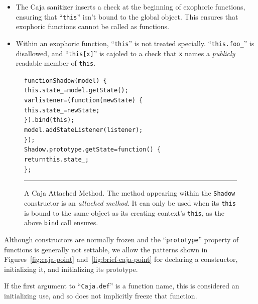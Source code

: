 \documentclass[letterpaper,twocolumn,10pt]{article}
\newcommand{\code}[1]{{\tt {#1}}}              %
\begin{document}
\begin{description}
  \begin{itemize}

    \item The Caja sanitizer inserts a check at the beginning of exophoric 
    functions, ensuring that ``\code{this}'' isn't bound to the global 
    object. This ensures that exophoric functions cannot be called as 
    functions.
    
    \item Within an exophoric function, ``\code{this}'' is not treated 
    specially. ``\code{this.foo\_}'' is disallowed, and ``\code{this[x]}'' is 
    cajoled to a check that \code{x} names a \emph{publicly} readable member 
    of \code{this}.

  \end{itemize}
  
\end{description}

\begin{figure}[t!]
\begin{alltt}
function Shadow(model)\ \{
  this.state_ = model.getState();
  var listener = (function(newState)\ \{
    this.state_ = newState;
  \}).bind(this);
  model.addStateListener(listener);
\});
Shadow.prototype.getState = function()\ \{
  return this.state_;
\};
\end{alltt}

\caption[A Caja Attached Method.]{A Caja Attached Method. The method 
appearing within the \code{Shadow} constructor is an \emph{attached method}. 
It can only be used when its \code{this} is bound to the same object as its 
creating context's \code{this}, as the above \code{bind} call ensures.\\ } 
\hrule
\label{fig:caja-attached-method}
\end{figure}

Although constructors are normally frozen and the ``\code{prototype}'' 
property of functions is generally not settable, we allow the 
patterns shown in Figures~\ref{fig:caja-point} and~\ref{fig:brief-caja-point} 
for declaring a constructor, initializing it, and initializing its prototype.

If the first argument to ``\code{Caja.def}'' is a function name, this is 
considered an initializing use, and so does not implicitly freeze that 
function. 
\end{document}
